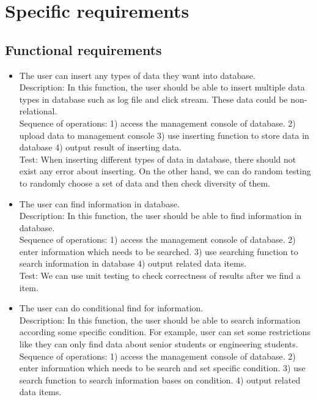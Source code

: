 \documentclass[10pt,draftclsnofoot,onecolumn,journal,compsoc]{IEEEtran}
\begin{document}
	\newpage
    
    \section{Specific requirements}
        \subsection{Functional requirements}
        \begin{itemize}
        \item The user can insert any types of data they want into database.\\
        Description: In this function, the user should be able to insert multiple data types in database such as log file and click stream. These data could be non-relational.\\
        Sequence of operations: 1) access the management console of database. 2) upload data to management console 3) use inserting function to store data in database 4) output result of inserting data.\\
        Test: When inserting different types of data in database, there should not exist any error about inserting. On the other hand, we can do random testing to randomly choose a set of data and then check diversity of them.
        \\
        \item The user can find information in database.\\
        Description: In this function, the user should be able to find information in database.\\
        Sequence of operations: 1) access the management console of database. 2) enter information which needs to be searched. 3) use searching function to search information in database 4) output related data items.\\ 
        Test: We can use unit testing to check correctness of results after we find a item.
        \\
        \item The user can do conditional find for information.\\
        Description: In this function, the user should be able to search information according some specific condition. For example, user can set some restrictions like they can only find data about senior students or engineering students.\\
        Sequence of operations: 1) access the management console of database. 2) enter information which needs to be search and set specific condition. 3) use search function to search information bases on condition. 4) output related data items.\\

\end{itemize}
\end{document}
